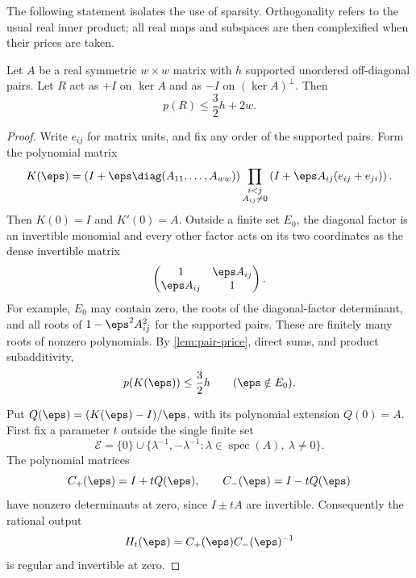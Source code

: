 The following statement isolates the use of sparsity.  Orthogonality
refers to the usual real inner product; all real maps and subspaces
are then complexified when their prices are taken.

\begin{lemma}
\label{reflect:sparse-reflection}
Let $A$ be a real symmetric $w\times w$ matrix with $h$ supported
unordered off-diagonal pairs.  Let $R$ act as $+I$ on $\ker A$ and
as $-I$ on $(\ker A)^\perp$.  Then
\[
 p(R)\leq \frac32h+2w.
\]
\end{lemma}

\begin{proof}
Write $e_{ij}$ for matrix units, and fix any order of the supported
pairs.  Form the polynomial matrix
\begin{equation}
 K(\eps)=\left(I+\eps\diag(A_{11},\ldots,A_{ww})\right)
       \prod_{\substack{i<j\\A_{ij}\ne0}}
       \left(I+\eps A_{ij}(e_{ij}+e_{ji})\right).
 \label{reflect:polynomial-product}
\end{equation}
Then $K(0)=I$ and $K'(0)=A$.  Outside a finite set $E_0$,
the diagonal factor is an invertible monomial and every other factor
acts on its two coordinates as the dense invertible matrix
\[
 \begin{pmatrix}1&\eps A_{ij}\\\eps A_{ij}&1\end{pmatrix}.
\]
For example, $E_0$ may contain zero, the roots of the diagonal-factor
determinant, and all roots of $1-\eps^2A_{ij}^2$ for the supported
pairs.  These are finitely many roots of nonzero polynomials.
By \cref{lem:pair-price}, direct sums, and product subadditivity,
\begin{equation}
 p(K(\eps))\leq \frac32h\qquad(\eps\notin E_0).
 \label{reflect:product-price}
\end{equation}

Put $Q(\eps)=(K(\eps)-I)/\eps$, with its polynomial extension
$Q(0)=A$.  First fix a parameter $t$ outside the single finite set
\begin{equation}
 \mathcal E=\{0\}\cup
 \{\lambda^{-1},-\lambda^{-1}:
                    \lambda\in\operatorname{spec}(A),\ \lambda\ne0\}.
 \label{reflect:outer-exceptions}
\end{equation}
The polynomial matrices
\[
 C_+(\eps)=I+tQ(\eps),\qquad C_-(\eps)=I-tQ(\eps)
\]
have nonzero determinants at zero, since $I\pm tA$ are invertible.
Consequently the rational output
\[
 H_t(\eps)=C_+(\eps)C_-(\eps)^{-1}
\]
is regular and invertible at zero.


\end{proof}
